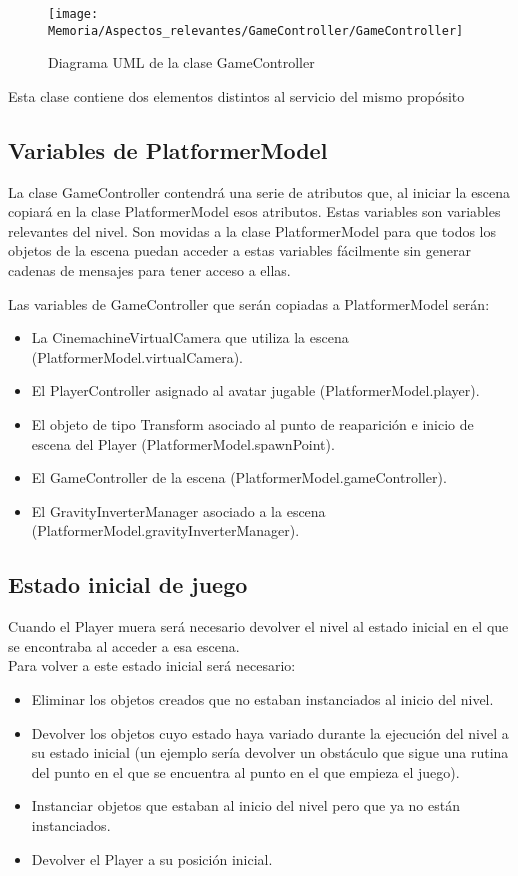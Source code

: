 \begin{figure}[h]
\centering
\texttt{[image: Memoria/Aspectos\_relevantes/GameController/GameController]}
\caption{Diagrama UML de la clase GameController}
\end{figure}

Esta clase contiene dos elementos distintos al servicio del mismo propósito

\subsection{Variables de PlatformerModel}
La clase GameController contendrá una serie de atributos que, al iniciar la escena copiará en la clase PlatformerModel esos atributos. Estas variables son variables relevantes del nivel. Son movidas a la clase PlatformerModel para que todos los objetos de la escena puedan acceder a estas variables fácilmente sin generar cadenas de mensajes para tener acceso a ellas.

Las variables de GameController que serán copiadas a PlatformerModel serán:
\begin{itemize}
\item
La CinemachineVirtualCamera que utiliza la escena (PlatformerModel.virtualCamera).
\item
El PlayerController asignado al avatar jugable (PlatformerModel.player).
\item
El objeto de tipo Transform asociado al punto de reaparición e inicio de escena del Player (PlatformerModel.spawnPoint).
\item
El GameController de la escena (PlatformerModel.gameController).
\item
El GravityInverterManager asociado a la escena \\ (PlatformerModel.gravityInverterManager).
\end{itemize}

\subsection{Estado inicial de juego}
Cuando el Player muera será necesario devolver el nivel al estado inicial en el que se encontraba al acceder a esa escena.\\
Para volver a este estado inicial será necesario:
\begin{itemize}
\item
Eliminar los objetos creados que no estaban instanciados al inicio del nivel.
\item
Devolver los objetos cuyo estado haya variado durante la ejecución del nivel a su estado inicial (un ejemplo sería devolver un obstáculo que sigue una rutina del punto en el que se encuentra al punto en el que empieza el juego).
\item
Instanciar objetos que estaban al inicio del nivel pero que ya no están instanciados.
\item
Devolver el Player a su posición inicial.
\end{itemize}

